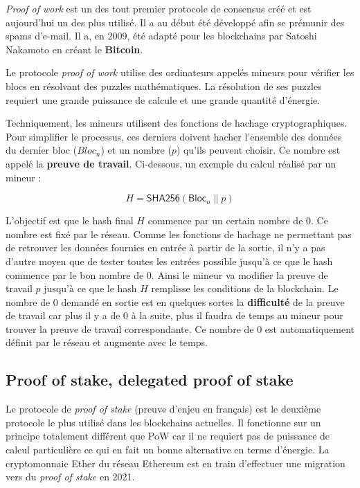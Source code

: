 \textit{Proof of work} est un des tout premier protocole de consensus créé et est aujourd'hui un des plus utilisé. Il a au début été développé afin se prémunir des spams d'e-mail. Il a, en 2009, été adapté pour les blockchains par Satoshi Nakamoto en créant le \textbf{Bitcoin}.

Le protocole \textit{proof of work} utilise des ordinateurs appelés mineurs pour vérifier les blocs en résolvant des puzzles mathématiques. La résolution de ses puzzles requiert une grande puissance de calcule et une grande quantité d'énergie.

Techniquement, les mineurs utilisent des fonctions de hachage cryptographiques. Pour simplifier le processus, ces derniers doivent hacher l'ensemble des données du dernier bloc ($Bloc_n$) et un nombre ($p$) qu'ils peuvent choisir. Ce nombre est appelé la \textbf{preuve de travail}. Ci-dessous, un exemple du calcul réalisé par un mineur :

\begin{equation*}
    H = \textsf{SHA256}(\textsf{Bloc}_n \| p)
\end{equation*}

L'objectif est que le hash final $H$ commence par un certain nombre de 0. Ce nombre est fixé par le réseau. Comme les fonctions de hachage ne permettant pas de retrouver les données fournies en entrée à partir de la sortie, il n'y a pas d'autre moyen que de tester toutes les entrées possible jusqu'à ce que le hash commence par le bon nombre de 0. Ainsi le mineur va modifier la preuve de travail $p$ jusqu'à ce que le hash $H$ remplisse les conditions de la blockchain. Le nombre de 0 demandé en sortie est en quelques sortes la \textbf{difficulté} de la preuve de travail car plus il y a de 0 à la suite, plus il faudra de temps au mineur pour trouver la preuve de travail correspondante. Ce nombre de 0 est automatiquement définit par le réseau et augmente avec le temps.

\subsection{Proof of stake, delegated proof of stake}
\label{consensus:pos}

Le protocole de \textit{proof of stake} (preuve d'enjeu en français) est le deuxième protocole le plus utilisé dans les blockchains actuelles. Il fonctionne sur un principe totalement différent que PoW car il ne requiert pas de puissance de calcul particulière ce qui en fait un bonne alternative en terme d'énergie. La cryptomonnaie Ether du réseau Ethereum est en train d'effectuer une migration vers du \textit{proof of stake} en 2021.

